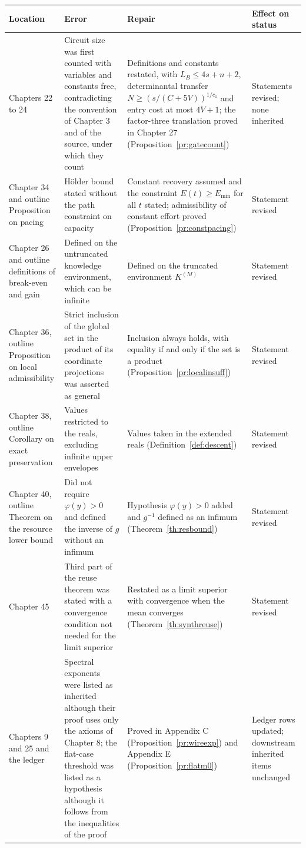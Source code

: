 \documentclass[11pt,letterpaper]{report}
\theoremstyle{plain}
\theoremstyle{definition}
\theoremstyle{remark}
\begin{document}
\begin{longtable}{>{\raggedright\arraybackslash}p{}>{\raggedright\arraybackslash}p{}>{\raggedright\arraybackslash}p{}>{\raggedright\arraybackslash}p{}}
\hline
Location & Error & Repair & Effect on status\\
\hline
\endhead
Chapters 22 to 24 & Circuit size was first counted with variables and constants free, contradicting the convention of Chapter 3 and of the source, under which they count & Definitions and constants restated, with $L_B\le4s+n+2$, determinantal transfer $N\ge(s/(C+5V))^{1/c_1}$ and entry cost at most $4V+1$; the factor-three translation proved in Chapter 27 (Proposition~\ref{pr:gatecount}) & Statements revised; none inherited\\
Chapter 34 and outline Proposition on pacing & H\"older bound stated without the path constraint on capacity & Constant recovery assumed and the constraint $E(t)\ge E_{\min}$ for all $t$ stated; admissibility of constant effort proved (Proposition~\ref{pr:constpacing}) & Statement revised\\
Chapter 26 and outline definitions of break-even and gain & Defined on the untruncated knowledge environment, which can be infinite & Defined on the truncated environment $K^{(M)}$ & Statement revised\\
Chapter 36, outline Proposition on local admissibility & Strict inclusion of the global set in the product of its coordinate projections was asserted as general & Inclusion always holds, with equality if and only if the set is a product (Proposition~\ref{pr:localinsuff}) & Statement revised\\
Chapter 38, outline Corollary on exact preservation & Values restricted to the reals, excluding infinite upper envelopes & Values taken in the extended reals (Definition~\ref{def:descent}) & Statement revised\\
Chapter 40, outline Theorem on the resource lower bound & Did not require $\varphi(y)>0$ and defined the inverse of $g$ without an infimum & Hypothesis $\varphi(y)>0$ added and $g^{-1}$ defined as an infimum (Theorem~\ref{th:resbound}) & Statement revised\\
Chapter 45 & Third part of the reuse theorem was stated with a convergence condition not needed for the limit superior & Restated as a limit superior with convergence when the mean converges (Theorem~\ref{th:synthreuse}) & Statement revised\\
Chapters 9 and 25 and the ledger & Spectral exponents were listed as inherited although their proof uses only the axioms of Chapter 8; the flat-case threshold was listed as a hypothesis although it follows from the inequalities of the proof & Proved in Appendix C (Proposition~\ref{pr:wireexp}) and Appendix E (Proposition~\ref{pr:flatm0}) & Ledger rows updated; downstream inherited items unchanged\\

\end{longtable}
\end{document}
